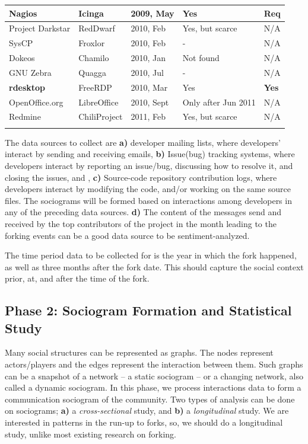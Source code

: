 \documentclass{acm_proc_article-sp}
\begin{document}
\begin{table} [!Ht]
\begin{tabular}{m{} m{} m{} m{} m{}}
Nagios & Icinga & 2009, May & Yes & Req \\ \hline
Project Darkstar& RedDwarf & 2010, Feb & Yes, but scarce & N/A \\ \hline
SysCP & Froxlor & 2010, Feb & - & N/A \\ \hline
Dokeos & Chamilo & 2010, Jan & Not found & N/A \\ \hline
GNU Zebra & Quagga & 2010, Jul & - & N/A \\ \hline
\textbf{rdesktop} & FreeRDP & 2010, Mar & Yes & \textbf{Yes} \\ \hline
OpenOffice.org & LibreOffice & 2010, Sept & Only after Jun 2011 & N/A \\ \hline
Redmine & ChiliProject & 2011, Feb & Yes, but scarce & N/A \\
\noalign{\smallskip}\hline
\end{tabular}
\end{table}


The data sources to collect are \textbf{a)} developer mailing lists, where developers' interact by sending and receiving emails, \textbf{b)} Issue(bug) tracking systems, where developers interact by reporting an issue/bug, discussing how to resolve it, and closing the issues, and , \textbf{c)} Source-code repository contribution logs, where developers interact by modifying the code, and/or working on the same source files. The sociograms will be formed based on interactions among developers in any of the preceding data sources. \textbf{d)} The content of the messages send and received by the top contributors of the project in the month leading to the forking events can be a good data source to be sentiment-analyzed.

The time period data to be collected for is the year in which the fork happened, as well as three months after the fork date. This should capture the social context prior, at, and after the time of the fork.

\subsection{Phase 2: Sociogram Formation and Statistical Study}

Many social structures can be represented as graphs. The nodes represent actors/players and the edges represent the interaction between them. Such graphs can be a snapshot of a network -- a static sociogram -- or a changing network, also called a dynamic sociogram. In this phase, we process interactions data to form a communication sociogram of the community. Two types of analysis can be done on sociograms; \textbf{a)} a \textit{cross-sectional} study, and \textbf{b)} a \textit{longitudinal} study. We are interested in patterns in the run-up to forks, so, we should do a longitudinal study, unlike most existing research on forking.
\end{document}
